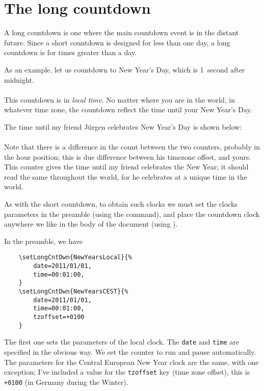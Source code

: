 \documentclass{article}
\begin{document}
\section{The long countdown}\label{s:long}

A long countdown is one where the main countdown event is in the distant
future. Since a short countdown is designed for less than one day, a long
countdown is for times greater than a day.

As an example, let us countdown to New Year's Day, which is 1~second after
midnight.\\[6pt]
\hspace*{20pt}\\[6pt]
This countdown is in \emph{local time}. No matter where you are in the
world, in whatever time zone, the countdown reflect the time until your
New Year's Day.

The time until my friend J\"{u}rgen celebrates New Year's Day is shown
below:\\[6pt]
\hspace*{20pt}\\[6pt]
Note that there is a difference in the count between the two counters, probably in
the hour position; this is due difference between his timezone offset, and yours.
This counter gives the time until my friend celebrates
the New Year; it should read the same throughout the world, for he
celebrates at a unique time in the world.

As with the short countdown, to obtain such clocks we must set the
clocks parameters in the preamble (using the  command),
and place the countdown clock anywhere we like in the body of the
document (using ).

In the preamble, we have

\begin{verbatim}
    \setLongCntDwn{NewYearsLocal}{%
        date=2011/01/01,
        time=00:01:00,
    }
    \setLongCntDwn{NewYearsCEST}{%
        date=2011/01/01,
        time=00:01:00,
        tzoffset=+0100
    }
\end{verbatim}
The first one sets the parameters of the local clock. The \texttt{date} and \texttt{time}
are specified in the obvious way. We set the counter to run and pause
automatically. The parameters for the Central European New Year clock are the same,
with one exception; I've included a value for the \texttt{tzoffset} key
(time zone offset), this is \texttt{+0100} (in Germany during the Winter).
\end{document}
